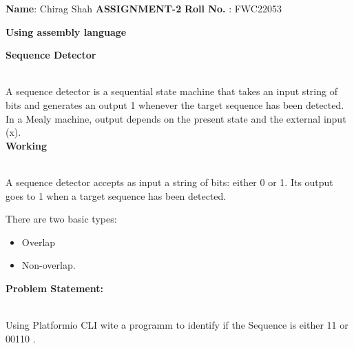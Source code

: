 \documentclass[10pt,a4paper]{report}
\begin{document}
\raggedright \textbf{Name}:\hspace{1mm} Chirag Shah\hspace{3cm} \Large \textbf{ASSIGNMENT-2}\hspace{2.5cm} %
\normalsize \textbf{Roll No.} :\hspace{1mm} FWC22053\vspace{1mm}
\begin{center}
\textbf{Using assembly language}\hspace{1cm}   \vspace{1cm}
\end{center}
\begin{multicols}{2}


\textbf{Sequence Detector}
\vspace{0.5cm}\raggedright \\A sequence detector is a sequential state machine that takes an input string of bits and generates an output 1 whenever the target sequence has been detected. In a Mealy machine, output depends on the present state and the external input (x).\vspace{3mm} \\ 
\textbf{Working}\vspace{1mm}
\raggedright \\A sequence detector accepts as input a string of bits: either 0 or 1. Its output goes to 1 when a target sequence has been detected.\vspace{3mm} \\ 
\raggedright There are two basic types:\vspace{3mm} 
\begin{itemize}
\item Overlap
\item Non-overlap. \vspace{2mm}
\end{itemize}
\raggedright \textbf{Problem Statement:}\vspace{2mm}
\raggedright \\Using Platformio CLI wite a programm to identify if the Sequence is either  11 or 00110 .

\vspace{5mm}


\end{multicols}
\end{document}
